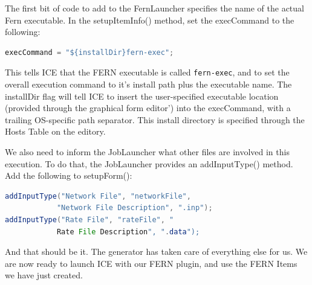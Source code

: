 The first bit of code to add to the FernLauncher specifies the name of the
actual Fern executable. In the setupItemInfo() method, set the execCommand to
the following: 
\begin{lstlisting}[language=Java]
execCommand = "${installDir}fern-exec";
\end{lstlisting}
This tells ICE that the FERN executable is called \texttt{fern-exec}, and to
set the overall execution command to it's install path plus the executable name.
The installDir flag will tell ICE to insert the user-specified executable
location (provided through the graphical form editor') into the execCommand,
with a trailing OS-specific path separator. This install directory is
specified through the Hosts Table on the editory. 

We also need to inform the JobLauncher what other files are involved in this
execution. To do that, the JobLauncher provides an addInputType() method. Add
the following to setupForm():
\begin{lstlisting}[language=Java]
addInputType("Network File", "networkFile", 
			"Network File Description", ".inp");
addInputType("Rate File", "rateFile", "
			Rate File Description", ".data");
\end{lstlisting}

And that should be it.
The generator has taken care of everything else for us.
We are now ready to launch ICE with our FERN plugin, and use the FERN Items we
have just created.
